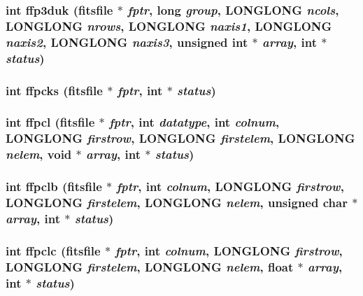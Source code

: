 \subsubsection{\setlength{\rightskip}{0pt plus 5cm}int ffp3duk (\bf{fitsfile} $\ast$ {\em fptr}, long {\em group}, \bf{LONGLONG} {\em ncols}, \bf{LONGLONG} {\em nrows}, \bf{LONGLONG} {\em naxis1}, \bf{LONGLONG} {\em naxis2}, \bf{LONGLONG} {\em naxis3}, unsigned int $\ast$ {\em array}, int $\ast$ {\em status})}\label{fitsio__64_8h_245d5b7ef5c4c394dbc0c7f3f55a5857}


\subsubsection{\setlength{\rightskip}{0pt plus 5cm}int ffpcks (\bf{fitsfile} $\ast$ {\em fptr}, int $\ast$ {\em status})}\label{fitsio__64_8h_1063ed09b8a73de4a574e6c4a49c1d72}


\subsubsection{\setlength{\rightskip}{0pt plus 5cm}int ffpcl (\bf{fitsfile} $\ast$ {\em fptr}, int {\em datatype}, int {\em colnum}, \bf{LONGLONG} {\em firstrow}, \bf{LONGLONG} {\em firstelem}, \bf{LONGLONG} {\em nelem}, void $\ast$ {\em array}, int $\ast$ {\em status})}\label{fitsio__64_8h_28b5f096ba5dc640cd642afdf31c7e01}


\subsubsection{\setlength{\rightskip}{0pt plus 5cm}int ffpclb (\bf{fitsfile} $\ast$ {\em fptr}, int {\em colnum}, \bf{LONGLONG} {\em firstrow}, \bf{LONGLONG} {\em firstelem}, \bf{LONGLONG} {\em nelem}, unsigned char $\ast$ {\em array}, int $\ast$ {\em status})}\label{fitsio__64_8h_292509f5a619292d087aaa3b8b40a621}


\subsubsection{\setlength{\rightskip}{0pt plus 5cm}int ffpclc (\bf{fitsfile} $\ast$ {\em fptr}, int {\em colnum}, \bf{LONGLONG} {\em firstrow}, \bf{LONGLONG} {\em firstelem}, \bf{LONGLONG} {\em nelem}, float $\ast$ {\em array}, int $\ast$ {\em status})}\label{fitsio__64_8h_f28b5d35cf1bfba0826c8bac66ecf702}


